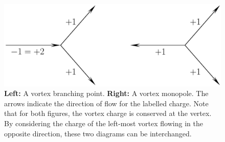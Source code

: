 \begin{figure}[htb!]
\centering
\includegraphics[width=0.9\linewidth]{./VortexBranching.pdf}
\caption[Vortex branching and monopole points]{\label{fig:VortexBranching}\textbf{Left:} A vortex branching point. \textbf{Right:} A vortex monopole. The arrows indicate the direction of flow for the labelled charge. Note that for both figures, the vortex charge is conserved at the vertex. By considering the charge of the left-most vortex flowing in the opposite direction, these two diagrams can be interchanged.}
\end{figure}
%

